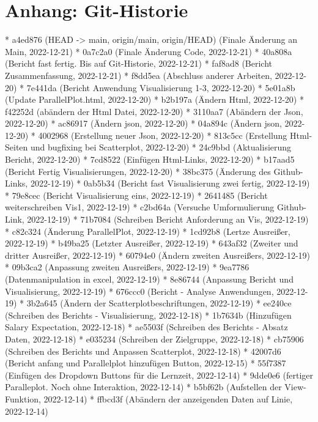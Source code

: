 \documentclass[usegeometry=true]{scrartcl}
\begin{document}
\newpage
\printbibliography

\section*{Anhang: Git-Historie}

* a4ed876 (HEAD -> main, origin/main, origin/HEAD) (Finale Änderung an Main, 2022-12-21)
* 0a7c2a0 (Finale Änderung Code, 2022-12-21)
* 40a808a (Bericht fast fertig. Bis auf Git-Historie, 2022-12-21)
* faf8ad8 (Bericht Zusammenfassung, 2022-12-21)
* f8dd5ea (Abschluss anderer Arbeiten, 2022-12-20)
* 7e441da (Bericht Anwendung Visualisierung 1-3, 2022-12-20)
* 5e01a8b (Update ParallelPlot.html, 2022-12-20)
* b2b197a (Ändern Html, 2022-12-20)
* f42252d (abändern der Html Datei, 2022-12-20)
* 3110aa7 (Abändern der Json, 2022-12-20)
* ac86917 (Ändern json, 2022-12-20)
* 04a894c (Ändern json, 2022-12-20)
* 4002968 (Erstellung neuer Json, 2022-12-20)
* 813c5cc (Erstellung Html-Seiten und bugfixing bei Scatterplot, 2022-12-20)
* 24c9bbd (Aktualisierung Bericht, 2022-12-20)
* 7cd8522 (Einfügen Html-Links, 2022-12-20)
* b17aad5 (Bericht Fertig Visualisierungen, 2022-12-20)
* 38bc375 (Änderung des Github-Links, 2022-12-19)
* 0ab5b34 (Bericht fast Visualisierung zwei fertig, 2022-12-19)
* 79e8cec (Bericht Visualisierung eins, 2022-12-19)
* 2641485 (Bericht weiterschreiben Vis1, 2022-12-19)
* c2bd64a (Versuche Umformulierung Github-Link, 2022-12-19)
* 71b7084 (Schreiben Bericht Anforderung an Vis, 2022-12-19)
* c82c324 (Änderung ParallelPlot, 2022-12-19)
* 1cd92b8 (Lertze Ausreißer, 2022-12-19)
* b49ba25 (Letzter Ausreißer, 2022-12-19)
* 643af32 (Zweiter und dritter Ausreißer, 2022-12-19)
* 60794e0 (Ändern zweiten Ausreißers, 2022-12-19)
* 09b3ca2 (Anpassung zweiten Ausreißers, 2022-12-19)
* 9ea7786 (Datenmanipulation in excel, 2022-12-19)
* 8e86744 (Anpassung Bericht und Visualisierung, 2022-12-19)
* 676ccc0 (Bericht - Analyse Anwendungen, 2022-12-19)
* 3b2a645 (Ändern der Scatterplotbeschriftungen, 2022-12-19)
* ee240ce (Schreiben des Berichts - Visualisierung, 2022-12-18)
* 1b7634b (Hinzufügen Salary Expectation, 2022-12-18)
* ae5503f (Schreiben des Berichts - Absatz Daten, 2022-12-18)
* e035234 (Schreiben der Zielgruppe, 2022-12-18)
* cb75906 (Schreiben des Berichts und Anpassen Scatterplot, 2022-12-18)
* 42007d6 (Bericht anfang und Parallelplot hinzufügen Button, 2022-12-15)
* 55f7387 (Einfügen des Dropdown Buttons für die Lernzeit, 2022-12-14)
* 9dde0e6 (fertiger Paralleplot. Noch ohne Interaktion, 2022-12-14)
* b5bf62b (Aufstellen der View-Funktion, 2022-12-14)
* ffbcd3f (Abändern der anzeigenden Daten auf Linie, 2022-12-14)
\end{document}
